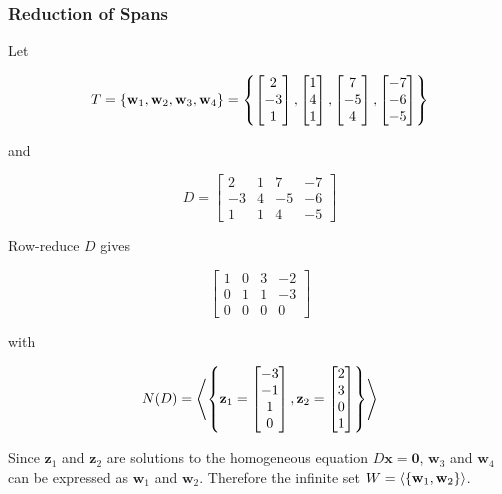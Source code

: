 \documentclass[a4paper,12pt]{article}
\begin{document}
\subsubsection{Reduction of Spans}
\begin{exm}
  Let

  $$T=\left\{ \mathbf{w}_{1},\mathbf{w}_{2},\mathbf{w}_{3},\mathbf{w}_{4}\right\}=\left\{ \begin{bmatrix}
    2\\
    -3\\
    1
  \end{bmatrix},\begin{bmatrix}
    1\\
    4\\
    1
  \end{bmatrix},\begin{bmatrix}
    7\\
    -5\\
    4
  \end{bmatrix},\begin{bmatrix}
    -7\\
    -6\\
    -5
  \end{bmatrix}\right\}$$\s

  and

  $$D=\begin{bmatrix}
    2 & 1 & 7 & -7\\
    -3 & 4 & -5 & -6\\
    1 & 1 & 4 & -5
  \end{bmatrix}$$

  Row-reduce $D$ gives
   
  $$\begin{bmatrix}
    1 & 0 & 3 & -2\\
    0 & 1 & 1 & -3\\
    0 & 0 & 0 & 0
  \end{bmatrix}$$\s

  with

  $$N(D)=\left\langle \left\{ \mathbf{z}_{1}=\begin{bmatrix}
    -3\\
    -1\\
    1\\
    0
  \end{bmatrix},\mathbf{z}_{2}=\begin{bmatrix}
    2\\
    3\\
    0\\
    1
  \end{bmatrix}\right\}\right\rangle$$\s

  Since $\mathbf{z}_{1}$ and $\mathbf{z}_{2}$ are solutions to the homogeneous equation $D\mathbf{x}=\mathbf{0}$, $\mathbf{w}_{3}$ and $\mathbf{w}_{4}$ can be expressed as $\mathbf{w}_{1}$ and $\mathbf{w}_{2}$. Therefore the infinite set $W=\left\langle \left\{ \mathbf{w}_{1},\mathbf{w}_{2}\right\}\right\rangle$.
\end{exm}
\end{document}
